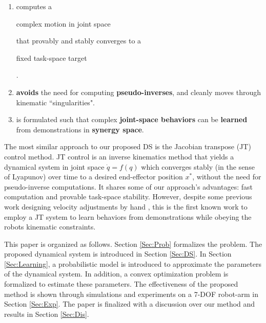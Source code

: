 \documentclass[letterpaper, 10 pt, conference,fleqn]{ieeeconf}
\begin{document}
\begin{enumerate}[leftmargin=*]
\item computes a \begin{bf}complex motion in joint space\end{bf} that provably and stably converges to a \begin{bf}fixed task-space target\end{bf}.
\item \textbf{avoids} the need for computing \textbf{pseudo-inverses}, and cleanly moves through kinematic ``singularities".
\item is formulated such that complex \textbf{joint-space behaviors} can be \textbf{learned} from demonstrations in \textbf{synergy space}.
\end{enumerate}

The most similar approach to our proposed DS is the Jacobian transpose (JT) control \cite{wolovich1984computational} method. JT control is an inverse kinematics
method that yields a dynamical system in joint space $\dot{q} = f(q)$ which converges stably (in the sense of Lyapunov) over time to a desired end-effector position $x^*$, without the need for pseudo-inverse computations. It shares some of our approach's advantages: fast computation and provable task-space stability. However, despite some previous work designing velocity adjustments by hand \cite{Shi2016}, this is the first known work to employ a JT system to learn behaviors from demonstrations while obeying the robots kinematic constraints.

This paper is organized as follows. Section \ref{Sec:Prob} formalizes the problem. The proposed dynamical system is introduced in Section \ref{Sec:DS}. In Section \ref{Sec:Learning}, a probabilistic model is introduced to approximate the parameters of the dynamical system. In addition, a convex optimization problem is  formalized to estimate these parameters. The effectiveness of the proposed method is shown through simulations and experiments on a 7-DOF robot-arm in Section \ref{Sec:Exp}. The paper is finalized with a discussion over our method and results in Section \ref{Sec:Dis}.

\end{document}
